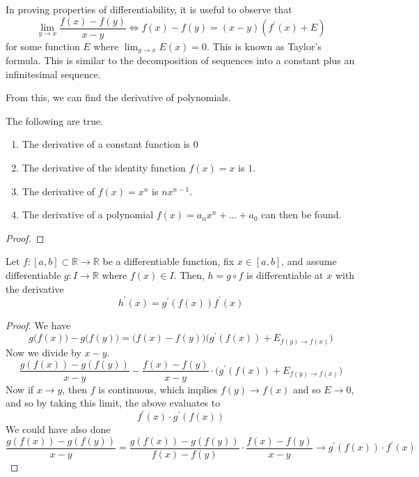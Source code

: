   In proving properties of differentiability, it is useful to observe that 
  \begin{equation}
    \lim_{y \to x} \frac{f(x) - f(y)}{x - y} \iff f(x) - f(y) = (x - y) (f^\prime (x) + E)
  \end{equation}
  for some function $E$ where $\lim_{y \to x} E(x) = 0$. This is known as Taylor's formula. This is similar to the decomposition of sequences into a constant plus an infinitesimal sequence. 

  From this, we can find the derivative of polynomials. 

  \begin{corollary}
    The following are true. 
    \begin{enumerate}
      \item The derivative of a constant function is $0$
      \item The derivative of the identity function $f(x) = x$ is $1$. 
      \item The derivative of $f(x) = x^n$ is $n x^{n-1}$. 
      \item The derivative of a polynomial $f(x) = a_n x^n + \ldots  + a_0$ can then be found. 
    \end{enumerate}
  \end{corollary}
  \begin{proof}
    
  \end{proof}  

  \begin{theorem}
    Let $f: [a, b] \subset \mathbb{R} \to \mathbb{R}$ be a differentiable function, fix $x \in [a, b]$, and assume differentiable $g: I \to \mathbb{R}$ where $f(x) \in I$. Then, $h = g \circ f$ is differentiable at $x$ with the derivative 
    \begin{equation}
      h^\prime (x) = g^\prime (f(x)) f^\prime (x)
    \end{equation}
  \end{theorem}
  \begin{proof}
    We have 
    \begin{equation}
      g \big( f(x)\big) - g \big( f(y)\big) = \big( f(x) - f(y) \big) \big( g^\prime (f(x)) + E_{f(y) \to f(x)}\big)
    \end{equation}
    Now we divide by $x - y$. 
    \begin{equation}
      \frac{g(f(x)) - g(f(y))}{x - y} - \frac{f(x) - f(y)}{x - y} \cdot \big( g^\prime (f(x)) + E_{f(y) \to f(x)} \big)
    \end{equation}
    Now if $x \to y$, then $f$ is continuous, which implies $f(y) \to f(x)$ and so $E \to 0$, and so by taking this limit, the above evaluates to 
    \begin{equation}
      f^\prime (x) \cdot g^\prime (f(x))
    \end{equation} 
    We could have also done 
    \begin{equation}
      \frac{g(f(x)) - g(f(y))}{x - y} = \frac{g(f(x)) - g(f(y))}{f(x) - f(y)} \cdot \frac{f(x) - f(y)}{x  - y} \to g^\prime (f(x)) \cdot f^\prime (x) 
    \end{equation}
  \end{proof}

